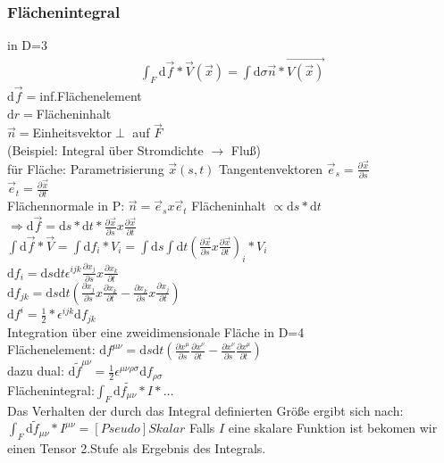 \documentclass[a4paper]{article}
\begin{document}
\subsubsection{Flächenintegral}
in D=3
\begin{align}
\int_F \mathrm{d}\vec{f}*\vec{V}(\vec{x})=\int \mathrm{d}\sigma \vec{n}*\vec{V(\vec{x})}
\end{align}
$\mathrm{d}\vec{f}=$inf.Flächenelement\\
$\mathrm{d}r=$Flächeninhalt\\
$\vec{n}=$Einheitsvektor$\perp$ auf $\vec{F}$\\
(Beispiel: Integral über Stromdichte $\rightarrow$ Fluß)\\
für Fläche: Parametrisierung $\vec{x}(s,t)$
Tangentenvektoren $\vec{e}_s=\frac{\partial\vec{x}}{\partial s}$ \\
$\vec{e}_t=\frac{\partial\vec{x}}{\partial t}$\\
Flächennormale in P: $\vec{n}=\vec{e}_s x \vec{e}_t$
Flächeninhalt $\propto \mathrm{d}s*\mathrm{d}t$\\
$\Rightarrow \mathrm{d}\vec{f}=\mathrm{d}s*\mathrm{d}t*\frac{\partial\vec{x}}{\partial
s}x\frac{\partial\vec{x}}{\partial t}$\\
$\int \mathrm{d}\vec{f}*\vec{V}=\int \mathrm{d}f_i*V_i=\int \mathrm{d}s \int \mathrm{d}t
(\frac{\partial\vec{x}}{\partial s}x\frac{\partial\vec{x}}{\partial t})_i *
V_i$\\
$\mathrm{d}f_i=\mathrm{d}s\mathrm{d}t\epsilon^{ijk}\frac{\partial x_j}{\partial
s}x\frac{\partial x_k}{\partial t}$\\
$\mathrm{d}f_{jk}=\mathrm{d}s \mathrm{d}t \left(\frac{\partial x_j}{\partial
s}x\frac{\partial x_k}{\partial t}-\frac{\partial x_k}{\partial
s}x\frac{\partial x_j}{\partial t}\right)$\\
$\mathrm{d}f^i=\frac{1}{2}*\epsilon^{ijk} \mathrm{d}f_{jk}$\\
Integration über eine zweidimensionale Fläche in D=4\\
Flächenelement: $\mathrm{d}f^{\mu\nu}=\mathrm{d}s \mathrm{d}t \left(\frac{\partial x^\mu}{\partial
s}\frac{\partial x^\nu}{\partial t}-\frac{\partial x^\nu}{\partial s}
\frac{\partial x^\mu}{\partial t} \right)$\\
dazu dual:
$\mathrm{d}\tilde{f}^{\mu\nu}=\frac{1}{2}\epsilon^{\mu\nu\rho\sigma}\mathrm{d}f_{\rho\sigma}$\\
Flächenintegral:$\int_F \mathrm{d}\tilde{f_{\mu\nu}} *I*\ldots$\\
Das Verhalten der durch das Integral definierten Größe ergibt sich nach:\\
$\int_F \mathrm{d}\tilde{f}_{\mu\nu} *I^{\mu\nu}=[Pseudo]Skalar$
Falls $I$ eine skalare Funktion ist bekomen wir einen Tensor 2.Stufe als
Ergebnis des Integrals.\\
\end{document}
